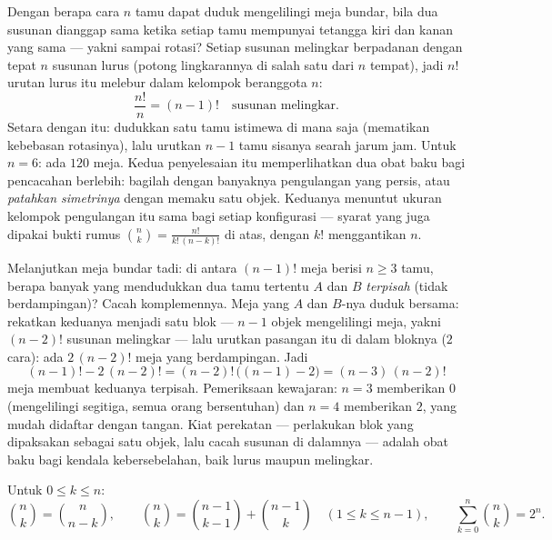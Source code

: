 \begin{example}\label{ex:b1:counting:roundtable}
Dengan berapa cara $n$ tamu dapat duduk mengelilingi meja bundar, bila dua
susunan dianggap sama ketika setiap tamu mempunyai tetangga kiri dan
kanan yang sama --- yakni sampai rotasi? Setiap susunan melingkar
berpadanan dengan tepat $n$ susunan lurus (potong lingkarannya di salah satu
dari $n$ tempat), jadi $n!$ urutan lurus itu melebur dalam kelompok
beranggota $n$:
\[
\frac{n!}{n} = (n-1)! \quad\text{susunan melingkar.}
\]
Setara dengan itu: dudukkan satu tamu istimewa di mana saja (mematikan
kebebasan rotasinya), lalu urutkan $n - 1$ tamu sisanya
searah jarum jam. Untuk $n = 6$: ada $120$ meja. Kedua penyelesaian itu
memperlihatkan dua obat baku bagi pencacahan berlebih: bagilah dengan
banyaknya pengulangan yang persis, atau \emph{patahkan simetrinya} dengan
memaku satu objek. Keduanya menuntut ukuran kelompok pengulangan itu sama
bagi setiap konfigurasi --- syarat yang juga dipakai bukti rumus
$\binom nk = \frac{n!}{k!\,(n-k)!}$ di atas, dengan
$k!$ menggantikan $n$.
\end{example}

\begin{example}\label{ex:b1:counting:constraint}
Melanjutkan meja bundar tadi: di antara $(n-1)!$ meja berisi $n \geq
3$ tamu, berapa banyak yang mendudukkan dua tamu tertentu $A$ dan $B$ \emph{terpisah}
(tidak berdampingan)? Cacah komplemennya. Meja yang $A$ dan $B$-nya
duduk bersama: rekatkan keduanya menjadi satu blok --- $n - 1$ objek
mengelilingi meja, yakni $(n-2)!$ susunan melingkar --- lalu
urutkan pasangan itu di dalam bloknya ($2$ cara): ada $2\,(n-2)!$ meja
yang berdampingan. Jadi
\[
(n-1)! - 2\,(n-2)! = (n-2)!\,\bigl((n - 1) - 2\bigr)
= (n-3)\,(n-2)!
\]
meja membuat keduanya terpisah. Pemeriksaan kewajaran: $n = 3$ memberikan $0$ (mengelilingi
segitiga, semua orang bersentuhan) dan $n = 4$ memberikan $2$,
yang mudah didaftar dengan tangan. Kiat perekatan --- perlakukan blok yang
dipaksakan sebagai satu objek, lalu cacah susunan di dalamnya --- adalah
obat baku bagi kendala kebersebelahan, baik lurus maupun melingkar.
\end{example}

\begin{proposition}\label{prop:b1:counting:identities}
Untuk $0 \leq k \leq n$:
\[
\binom{n}{k} = \binom{n}{n-k},
\qquad
\binom{n}{k} = \binom{n-1}{k-1} + \binom{n-1}{k}
\quad (1 \leq k \leq n-1),
\qquad
\sum_{k=0}^{n} \binom{n}{k} = 2^n .
\]
\end{proposition}

